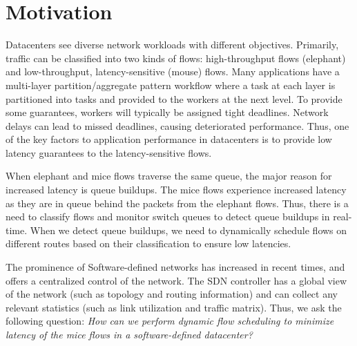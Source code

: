 \section{Motivation}
Datacenters see diverse network workloads with different objectives. Primarily, traffic can be classified into two kinds of flows: high-throughput flows (elephant) and low-throughput, latency-sensitive (mouse) flows. Many applications have a multi-layer partition/aggregate pattern workflow where a task at each layer is partitioned into tasks and provided to the workers at the next level. To provide some guarantees, workers will typically be assigned tight deadlines. Network delays can lead to missed deadlines, causing deteriorated performance. Thus,
one of the key factors to application performance in datacenters is to provide low latency guarantees to the latency-sensitive flows.
 
When elephant and mice flows traverse the same queue, the major reason for increased latency is queue buildups. The mice flows experience increased latency as they are in queue behind the packets from the elephant flows. Thus, there is a need to classify flows and monitor switch queues to detect queue buildups in real-time. When we detect queue buildups, we need to dynamically schedule flows on different routes based on their classification to ensure low latencies. 

The prominence of Software-defined networks has increased in recent times, and offers a centralized control of the network. The SDN controller has a global view of the network (such as topology and routing information) and can collect any relevant statistics (such as link utilization and traffic matrix). Thus, we ask the following question: \emph{How can we perform dynamic flow scheduling to minimize latency of the mice flows in a software-defined datacenter? }  